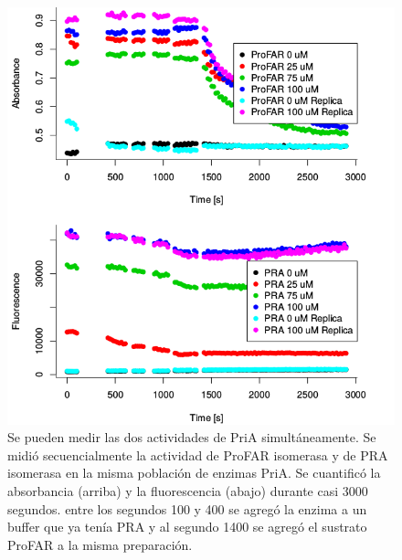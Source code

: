 \documentclass[12pt,twoside]{reedthesis}
\begin{document}
  \begin{figure}[h!tbp]
  \centering
  \includegraphics[angle = 0,scale = 0.6]{chapter4/Conjunto.png}
  \caption[Se pueden medir las dos actividades de PriA simultáneamente.]{\footnotesize{Se pueden medir las dos actividades de PriA simultáneamente. Se midió secuencialmente la actividad de ProFAR isomerasa y de PRA isomerasa en la misma población de enzimas PriA. Se cuantificó la absorbancia (arriba) y la fluorescencia (abajo) durante casi 3000 segundos. entre los segundos 100 y 400 se agregó la enzima a un buffer que ya tenía PRA y al segundo 1400 se agregó el sustrato ProFAR a la misma preparación. }}
  \label{fig:Conjunto}
  \end{figure}
  
\end{document}
